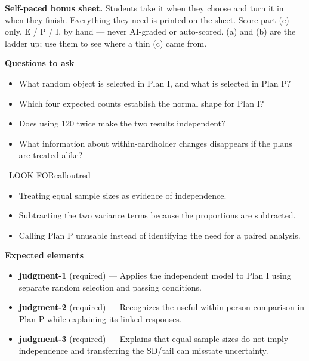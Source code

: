 \documentclass[11pt]{article}
\begin{document}
\textbf{Self-paced bonus sheet.} Students take it when they choose and turn it in when they finish. Everything they need is printed on the sheet. Score part (c) only, E / P / I, by hand --- never AI-graded or auto-scored. (a) and (b) are the ladder up; use them to see where a thin (c) came from.\par

\textbf{Questions to ask}
\begin{itemize}[leftmargin=1.5em,itemsep=2pt,topsep=2pt]
  \item What random object is selected in Plan I, and what is selected in Plan P?
  \item Which four expected counts establish the normal shape for Plan I?
  \item Does using 120 twice make the two results independent?
  \item What information about within-cardholder changes disappears if the plans are treated alike?
\end{itemize}

\begin{callout}{\IconWarn\ LOOK FOR}{calloutred}
\begin{itemize}[leftmargin=1.5em,itemsep=2pt,topsep=2pt]
  \item Treating equal sample sizes as evidence of independence.
  \item Subtracting the two variance terms because the proportions are subtracted.
  \item Calling Plan P unusable instead of identifying the need for a paired analysis.
\end{itemize}
\end{callout}


\textbf{Expected elements}
\begin{itemize}[leftmargin=1.5em,itemsep=2pt,topsep=2pt]
  \item \textbf{judgment-1} (required) --- Applies the independent model to Plan I using separate random selection and passing conditions.
  \item \textbf{judgment-2} (required) --- Recognizes the useful within-person comparison in Plan P while explaining its linked responses.
  \item \textbf{judgment-3} (required) --- Explains that equal sample sizes do not imply independence and transferring the SD/tail can misstate uncertainty.
\end{itemize}
\end{document}
